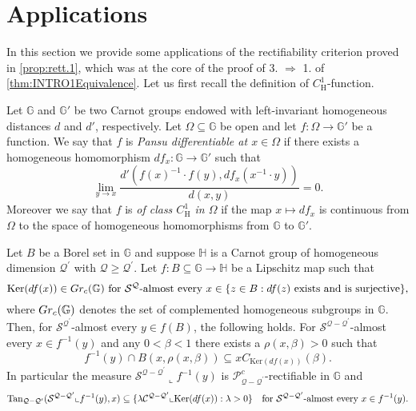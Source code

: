 \documentclass[10pt, a4paper,
oneside, headinclude,footinclude]{scrartcl}
\begin{document}
\section{Applications}

In this section we provide some applications of the rectifiability criterion proved in \cref{prop:rett.1}, which was at the core of the proof of 3. $\Rightarrow$ 1. of \cref{thm:INTRO1Equivalence}. Let us first recall the definition of $C^1_{\mathrm H}$-function.
\begin{definizione}\label{def:C1h}
Let $\mathbb G$ and $\mathbb G'$ be two Carnot groups endowed with left-invariant homogeneous distances $d$ and $d'$, respectively. Let $\Omega\subseteq \mathbb G$ be open and let $f:\Omega\to\mathbb G'$ be a function. We say that $f$ is {\em Pansu differentiable at $x\in\Omega$} if there exists a homogeneous homomorphism $df_x:\mathbb G\to\mathbb G'$ such that
$$
\lim_{y\to x}\frac{d'(f(x)^{-1}\cdot f(y),df_x(x^{-1}\cdot y))}{d(x,y)}=0.
$$
Moreover we say that $f$ is {\em of class $C^1_{\mathrm H}$ in $\Omega$} if the map $x\mapsto df_x$ is continuous from $\Omega$ to the space of homogeneous homomorphisms from $\mathbb G$ to $\mathbb G'$.
\end{definizione}

\begin{proposizione}\label{structure:liplevelsets}
Let $B$ be a Borel set in $\mathbb{G}$ and suppose $\mathbb{H}$ is a Carnot group of homogeneous dimension $\mathcal{Q}^\prime$ with $\mathcal{Q}\geq\mathcal{Q}^\prime$. Let $f:B\subseteq \mathbb{G}\to \mathbb{H}$ be a Lipschitz map such that
\begin{equation}
    \text{$\mathrm{Ker}(df(x))\in Gr_c(\mathbb{G})$ for $\mathcal{S}^{\mathcal{Q}}$-almost every $x\in \{z\in B:df(z) \text{ exists and is surjective}\}$,}
    \label{condizionesurj}
\end{equation}
where $Gr_c(\mathbb G)$ denotes the set of complemented homogeneous subgroups in $\mathbb G$.
Then, for $\mathcal{S}^{\mathcal{Q}^\prime}$-almost every $y\in f(B)$, the following holds. For $\mathcal{S}^{\mathcal{Q}-\mathcal{Q}^\prime}$-almost every $x\in f^{-1}(y)$ and any $0<\beta<1$ there exists a $\rho(x,\beta)>0$ such that 
$$f^{-1}(y)\cap B(x,\rho(x,\beta))\subseteq xC_{\mathrm{Ker}(df(x))}(\beta).$$
In particular the measure $\mathcal{S}^{\mathcal{Q}-\mathcal{Q}^\prime}\llcorner f^{-1}(y)$ is $\mathscr{P}^c_{\mathcal{Q}-\mathcal{Q}^\prime}$-rectifiable in $\mathbb{G}$ and $$\mathrm{Tan}_{\mathcal{Q}-\mathcal{Q}^\prime}(\mathcal{S}^{\mathcal{Q}-\mathcal{Q}^\prime}\llcorner f^{-1}(y),x)\subseteq\{\lambda\mathcal{C}^{\mathcal{Q}-\mathcal{Q}^\prime}\llcorner \mathrm{Ker}(df(x)):\lambda> 0\}\quad\text{for $\mathcal{S}^{\mathcal{Q}-\mathcal{Q}^\prime}$-almost every $x\in f^{-1}(y)$.}$$
\end{proposizione}
\end{document}

